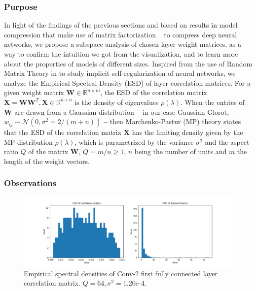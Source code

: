 \subsubsection*{Purpose}
In light of the findings of the previous sections and based on results in model compression that make use of matrix factorization ~\autocite{lebedev2014speeding} to compress deep neural networks, we propose a subspace analysis of chosen layer weight matrices, as a way to confirm the intuition we got from the visualization, and to learn more about the properties of models of different sizes. Inspired from the use of Random Matrix Theory in \cite{martin2018implicit} to study implicit self-regularization of neural networks, we analyze the Empirical Spectral Density (ESD) of layer correlation matrices. For a given weight matrix $\mathbf{W} \in \mathbb{R}^{n \times m}$, the ESD of the correlation matrix $\mathbf{X} = \mathbf{W}\mathbf{W}^T, \mathbf{X} \in \mathbb{R}^{n \times n}$ is the density of eigenvalues $\rho(\lambda)$. When the entries of $\mathbf{W}$ are drawn from a Gaussian distribution \textbf{--} in our case Gaussian Glorot, $w_{ij} \sim \mathcal{N}(0, \sigma^2 = 2 / (m+n))$ \textbf{--} then Marchenko-Pastur (MP) theory states that the ESD of the correlation matrix $\mathbf{X}$ has the limiting density given by the MP distribution $\rho(\lambda)$, which is parametrized by the variance $\sigma^2$ and the aspect ratio $Q$ of the matrix $\mathbf{W}$, $Q = m/n \geq 1$, $n$ being the number of units and $m$ the length of the weight vectors.

\subsubsection*{Observations}

\begin{figure}[H]
\centering
	\includegraphics[scale=0.36]{images/conv2-fc1-svd-comp.png}
\caption{Empirical spectral densities of Conv-2 first fully connected layer correlation matrix. $Q = 64, \sigma^2 = 1.20$e-4.}
\label{fig:conv2-fc1-svd-comp} 
\end{figure}

